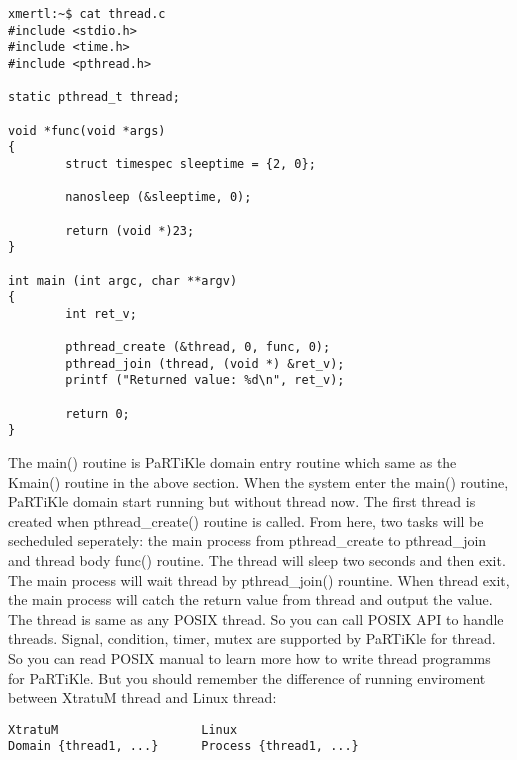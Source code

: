 \begin{lstlisting} 
xmertl:~$ cat thread.c
#include <stdio.h>
#include <time.h>
#include <pthread.h>

static pthread_t thread;

void *func(void *args)
{
        struct timespec sleeptime = {2, 0};

        nanosleep (&sleeptime, 0);

        return (void *)23;
}

int main (int argc, char **argv) 
{
        int ret_v;

        pthread_create (&thread, 0, func, 0);
        pthread_join (thread, (void *) &ret_v);
        printf ("Returned value: %d\n", ret_v);
        
        return 0;
}
\end{lstlisting}

The main() routine is PaRTiKle domain entry routine which same as the Kmain() routine in the above section. When the system enter the main() routine, PaRTiKle domain start running but without thread now. The first thread is created when pthread\_create() routine is called. From here, two tasks will be secheduled seperately: the main process from pthread\_create to pthread\_join and thread body func() routine. The thread will sleep two seconds and then exit. The main process will wait thread by pthread\_join() rountine. When thread exit, the main process will catch the return value from thread and output the value. 
\\
The thread is same as any POSIX thread. So you can call POSIX  API to handle threads. Signal, condition, timer, mutex are supported by PaRTiKle for thread. So you can read POSIX manual to learn more how to write thread programms for PaRTiKle. But you should remember the difference of running enviroment between XtratuM thread and Linux thread:
\begin{verbatim}
XtratuM                    Linux
Domain {thread1, ...}      Process {thread1, ...}
\end{verbatim}
